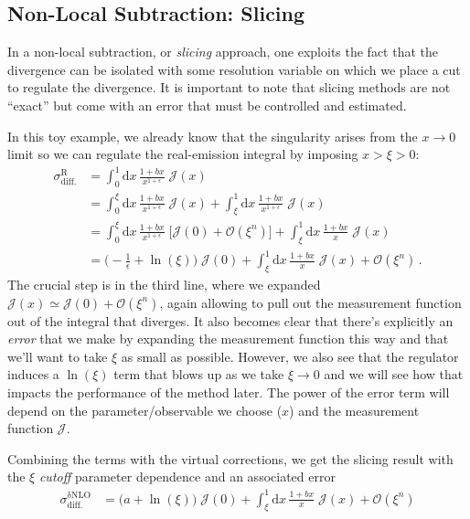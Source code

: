 \documentclass[11pt]{article}
\begin{document}
\subsection{Non-Local Subtraction: Slicing}
\label{sec:org9bbd365}
In a non-local subtraction, or \emph{slicing} approach, one exploits the fact that the divergence can be isolated with some resolution variable on which we place a cut to regulate the divergence.
It is important to note that slicing methods are not ``exact'' but come with an error that must be controlled and estimated.

In this toy example, we already know that the singularity arises from the \(x\to0\) limit so we can regulate the real-emission integral by imposing \(x > \xi > 0\):
\begin{align}
  \sigma^\mathrm{R}_\mathrm{diff.}
  &=
  \int_0^1\mathrm{d}x\,\frac{1+bx}{x^{1+\epsilon}}
  \;\mathcal{J}(x)
  \nonumber\\&=
  \int_0^\xi\mathrm{d}x\,\frac{1+bx}{x^{1+\epsilon}}
  \;\mathcal{J}(x) +
  \int_\xi^1\mathrm{d}x\,\frac{1+bx}{x^{1+\epsilon}}
  \;\mathcal{J}(x)
  \nonumber\\&=
  \int_0^\xi\mathrm{d}x\,\frac{1+bx}{x^{1+\epsilon}}
  \;\Big[\mathcal{J}(0) + \mathcal{O}(\xi^n)\Bigr]
  +\int_\xi^1\mathrm{d}x\,\frac{1+bx}{x}
  \;\mathcal{J}(x)
  \nonumber\\&=
  \biggl( -\frac{1}{\epsilon} + \ln(\xi) \biggr) \;\mathcal{J}(0)
  +\int_\xi^1\mathrm{d}x\,\frac{1+bx}{x}
  \;\mathcal{J}(x)
  + \mathcal{O}(\xi^n)
  \,.
\end{align}
The crucial step is in the third line, where we expanded \(\mathcal{J}(x) \simeq \mathcal{J}(0) + \mathcal{O}(\xi^n)\), again allowing to pull out the measurement function out of the integral that diverges.
It also becomes clear that there's explicitly an \emph{error} that we make by expanding the measurement function this way and that we'll want to take \(\xi\) as small as possible.
However, we also see that the regulator induces a \(\ln(\xi)\) term that blows up as we take \(\xi\to0\) and we will see how that impacts the performance of the method later.
The power of the error term will depend on the parameter/observable we choose (\(x\)) and the measurement function \(\mathcal{J}\).

Combining the terms with the virtual corrections, we get the slicing result with the \(\xi\) \emph{cutoff} parameter
dependence and an associated error
\begin{align}
\label{eq:slice}
  \sigma^\mathrm{\delta NLO}_\mathrm{diff.}
  &=
  \bigl(a + \ln(\xi)\bigr) \;\mathcal{J}(0)
  +\int_\xi^1\mathrm{d}x\,\frac{1+bx}{x}
  \;\mathcal{J}(x)
  + \mathcal{O}(\xi^n)
\end{align}
\end{document}
